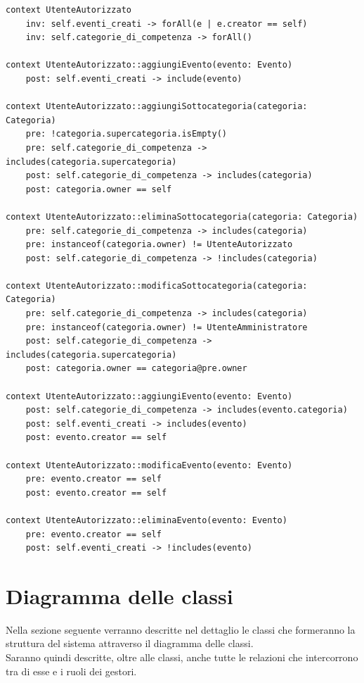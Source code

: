 \documentclass{article}
\begin{document}
\begin{verbatim}
context UtenteAutorizzato
    inv: self.eventi_creati -> forAll(e | e.creator == self)
    inv: self.categorie_di_competenza -> forAll()

context UtenteAutorizzato::aggiungiEvento(evento: Evento)
    post: self.eventi_creati -> include(evento)

context UtenteAutorizzato::aggiungiSottocategoria(categoria: Categoria)
    pre: !categoria.supercategoria.isEmpty()
    pre: self.categorie_di_competenza -> includes(categoria.supercategoria)
    post: self.categorie_di_competenza -> includes(categoria)
    post: categoria.owner == self

context UtenteAutorizzato::eliminaSottocategoria(categoria: Categoria)
    pre: self.categorie_di_competenza -> includes(categoria)
    pre: instanceof(categoria.owner) != UtenteAutorizzato
    post: self.categorie_di_competenza -> !includes(categoria)

context UtenteAutorizzato::modificaSottocategoria(categoria: Categoria)
    pre: self.categorie_di_competenza -> includes(categoria)
    pre: instanceof(categoria.owner) != UtenteAmministratore
    post: self.categorie_di_competenza -> includes(categoria.supercategoria)
    post: categoria.owner == categoria@pre.owner

context UtenteAutorizzato::aggiungiEvento(evento: Evento)
    post: self.categorie_di_competenza -> includes(evento.categoria)
    post: self.eventi_creati -> includes(evento)
    post: evento.creator == self

context UtenteAutorizzato::modificaEvento(evento: Evento)
    pre: evento.creator == self
    post: evento.creator == self

context UtenteAutorizzato::eliminaEvento(evento: Evento)
    pre: evento.creator == self
    post: self.eventi_creati -> !includes(evento)
\end{verbatim}

\section{Diagramma delle classi}

Nella sezione seguente verranno descritte nel dettaglio le classi che formeranno la struttura del sistema attraverso il diagramma delle classi.\\
Saranno quindi descritte, oltre alle classi, anche tutte le relazioni che intercorrono tra di esse e i ruoli dei gestori.\\
\end{document}
